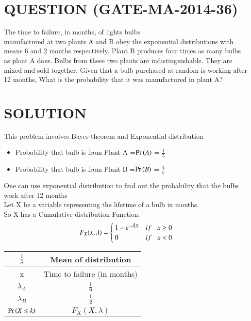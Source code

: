 \documentclass[journal,12pt,twocolumn]{IEEEtran}
\begin{document}
\section*{QUESTION (GATE-MA-2014-36)}
The time to failure, in months, of lights bulbs \\manufactured at two plants A and B
obey the exponential distributions with means 6 and 2 months respectively. Plant B produces
four times as many bulbs as plant A does. Bulbs from these two plants are indistinguishable.
They are mixed and sold together. Given that a bulb purchased at random is working after 12 months, What is the probability that it was manufactured in plant A?
\section*{SOLUTION}
This problem involves Bayes theorem and \newline Exponential distribution
\bigskip
\begin{itemize}
    \item Probability that bulb is from Plant A =\newline $\Pr\left(A\right)$ = \(\frac{1}{5}\)
    \item Probability that bulb is from Plant B =\newline$\Pr\left(B\right)$ = \( \frac{4}{5} \)
\end{itemize}
\bigskip
One can use exponential distribution to find out the probability that the bulbs work after 12 months\\
Let X be a variable representing the lifetime of a bulb in months.\\
So X has a Cumulative distribution Function:
\begin{equation}
    F_X(x,\lambda) =
    \begin{cases}
        1 - {e}^{-\displaystyle\lambda x} & if \hspace{0.3cm}x \geq 0 \\
        0                                 & if \hspace{0.3cm}x < 0
    \end{cases}
\end{equation}
\begin{table}[H]
    \begin{center}
        \resizebox{\columnwidth}{!}
        {
            \begin{tabular}{|c|c|}
                \hline
                $\frac{1}{\displaystyle\lambda}$ &  Mean of distribution\\
                \hline
                x & Time to failure (in months)\\
                \hline
                $\lambda_A$ & $\frac{1}{6}$\\
                \hline
                $\lambda_B$ & $\frac{1}{2}$\\
                \hline
                $\Pr\left(X\leq k\right)$ & $F_X(X,\lambda)$\\
                \hline
            \end{tabular}
        }
    \end{center}
\end{table}
\end{document}

